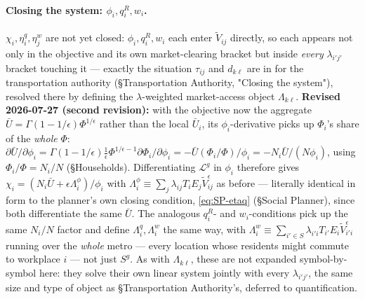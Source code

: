 \documentclass[12pt, a4paper]{article}
\theoremstyle{definition}
\theoremstyle{remark}
\begin{document}
\paragraph{Closing the system: $\phi_i,q_i^R,w_i$.} $\chi_i,\eta_i^q,\eta_j^w$ are not yet closed: $\phi_i,q_i^R,w_i$ each enter $\tilde V_{ij}$ directly, so each appears not only in the objective and its own market-clearing bracket but inside \emph{every} $\lambda_{i'j'}$ bracket touching it — exactly the situation $\tau_{ij}$ and $d_{k\ell}$ are in for the transportation authority (\S Transportation Authority, "Closing the system"), resolved there by defining the $\lambda$-weighted market-access object $\Lambda_{k\ell}$. \textbf{Revised 2026-07-27 (second revision):} with the objective now the aggregate $\bar U=\Gamma(1-1/\epsilon)\Phi^{1/\epsilon}$ rather than the local $\bar U_i$, its $\phi_i$-derivative picks up $\Phi_i$'s share of the \emph{whole} $\Phi$: $\partial\bar U/\partial\phi_i=\Gamma(1-1/\epsilon)\tfrac1\epsilon\Phi^{1/\epsilon-1}\partial\Phi_i/\partial\phi_i=-\bar U(\Phi_i/\Phi)/\phi_i=-N_i\bar U/(N\phi_i)$, using $\Phi_i/\Phi=N_i/N$ (\S Households). Differentiating $\mathcal L^g$ in $\phi_i$ therefore gives $\chi_i=(N_i\bar U+\epsilon\Lambda_i^\phi)/\phi_i$ with $\Lambda_i^\phi\equiv\sum_j\lambda_{ij}T_iE_j\tilde V_{ij}^\epsilon$ as before — literally identical in form to the planner's own closing condition, \eqref{eq:SP-etaq} (\S Social Planner), since both differentiate the same $\bar U$. The analogous $q_i^R$- and $w_i$-conditions pick up the same $N_i/N$ factor and define $\Lambda_i^q,\Lambda_i^w$ the same way, with $\Lambda_i^w\equiv\sum_{i'\in S}\lambda_{i'i}T_{i'}E_i\tilde V_{i'i}^\epsilon$ running over the \emph{whole} metro — every location whose residents might commute to workplace $i$ — not just $S^g$. As with $\Lambda_{k\ell}$, these are not expanded symbol-by-symbol here: they solve their own linear system jointly with every $\lambda_{i'j'}$, the same size and type of object as \S Transportation Authority's, deferred to quantification.
\end{document}
